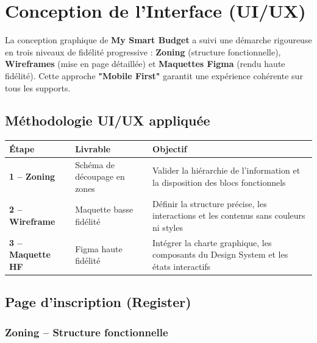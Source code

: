 \section{Conception de l'Interface (UI/UX)}

La conception graphique de \textbf{My Smart Budget} a suivi une démarche rigoureuse en trois niveaux de fidélité progressive : \textbf{Zoning} (structure fonctionnelle), \textbf{Wireframes} (mise en page détaillée) et \textbf{Maquettes Figma} (rendu haute fidélité). Cette approche \textbf{"Mobile First"} garantit une expérience cohérente sur tous les supports.

\subsection{Méthodologie UI/UX appliquée}

\begin{center}
\small
\begin{tabular}{|p{}|p{}|p{}|}
\hline
\textbf{Étape} & \textbf{Livrable} & \textbf{Objectif} \\
\hline
\textbf{1 -- Zoning} & Schéma de découpage en zones & Valider la hiérarchie de l'information et la disposition des blocs fonctionnels \\
\hline
\textbf{2 -- Wireframe} & Maquette basse fidélité & Définir la structure précise, les interactions et les contenus sans couleurs ni styles \\
\hline
\textbf{3 -- Maquette HF} & Figma haute fidélité & Intégrer la charte graphique, les composants du Design System et les états interactifs \\
\hline
\end{tabular}
\end{center}

\subsection{Page d'inscription (Register)}

\subsubsection{Zoning -- Structure fonctionnelle}

